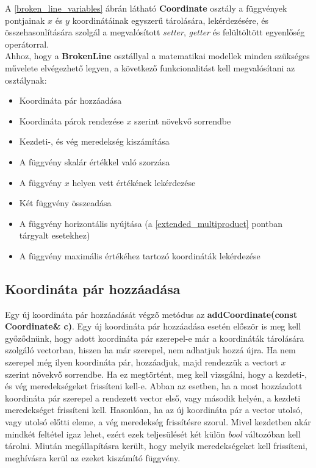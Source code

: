 A \ref{broken_line_variables} ábrán látható \textbf{Coordinate} osztály a függvények pontjainak $x$ és $y$ koordinátáinak egyszerű tárolására, lekérdezésére, és összehasonlítására szolgál a megvalósított \textit{setter}, \textit{getter} és felültöltött egyenlőség operátorral.\\
Ahhoz, hogy a \textbf{BrokenLine} osztállyal a matematikai modellek minden szükséges művelete elvégezhető legyen, a következő funkcionalitást kell megvalósítani az osztálynak:
\begin{itemize}
\item Koordináta pár hozzáadása
\item Koordináta párok rendezése $x$ szerint növekvő sorrendbe
\item Kezdeti-, és vég meredekség kiszámítása
\item A függvény skalár értékkel való szorzása
\item A függvény $x$ helyen vett értékének lekérdezése
\item Két függvény összeadása
\item A függvény horizontális nyújtása (a \ref{extended_multiproduct} pontban tárgyalt esetekhez)
\item A függvény maximális értékéhez tartozó koordináták lekérdezése
\end{itemize} 
\subsection{Koordináta pár hozzáadása} \label{addCoordinates}
Egy új koordináta pár hozzáadását végző metódus az \textbf{addCoordinate(const Coordinate\& c)}. Egy új koordináta pár hozzáadása esetén először is meg kell győződnünk, hogy adott koordináta pár szerepel-e már a koordináták tárolására szolgáló vectorban, hiszen ha már szerepel, nem adhatjuk hozzá újra. Ha nem szerepel még ilyen koordináta pár, hozzáadjuk, majd rendezzük a vectort $x$ szerint növekvő sorrendbe. Ha ez megtörtént, meg kell vizsgálni, hogy a kezdeti-, és vég meredekségeket frissíteni kell-e. Abban az esetben, ha a most hozzáadott koordináta pár szerepel a rendezett vector első, vagy második helyén, a kezdeti meredekséget frissíteni kell. Hasonlóan, ha az új koordináta pár a vector utolsó, vagy utolsó előtti eleme, a vég meredekség frissítésre szorul. Mivel kezdetben akár mindkét feltétel igaz lehet, ezért ezek teljesülését két külön \textit{bool} változóban kell tárolni. Miután megállapításra került, hogy melyik meredekségeket kell frissíteni, meghívásra kerül az ezeket kiszámító függvény. 
